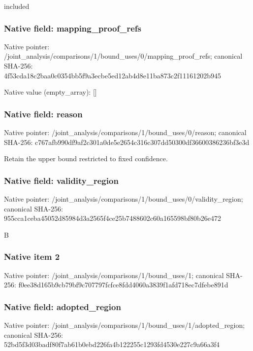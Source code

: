\documentclass[10pt,a4paper]{article}
\begin{document}
\begingroup\raggedright\sloppy included\par\endgroup

\subsubsection{Native field: mapping\_\allowbreak{}proof\_\allowbreak{}refs}
Native pointer: /joint\_\allowbreak{}analysis/comparisons/1/bound\_\allowbreak{}uses/0/mapping\_\allowbreak{}proof\_\allowbreak{}refs; canonical SHA-256: 4f53cda18c2baa0c0354bb5f9a3ecbe5ed12ab4d8e11ba873c2f11161202b945

Native value (empty\_\allowbreak{}array): []

\subsubsection{Native field: reason}
Native pointer: /joint\_\allowbreak{}analysis/comparisons/1/bound\_\allowbreak{}uses/0/reason; canonical SHA-256: c767afb990df9af2c301a0de5e2654c316c307dd50300df36600386236bf3e3d

\begingroup\raggedright\sloppy Retain the upper bound restricted to fixed confidence.\par\endgroup

\subsubsection{Native field: validity\_\allowbreak{}region}
Native pointer: /joint\_\allowbreak{}analysis/comparisons/1/bound\_\allowbreak{}uses/0/validity\_\allowbreak{}region; canonical SHA-256: 955cca1ceba45052d85984d3a2565f4ce25b7488602c60a165598bf80b26e472

\begingroup\raggedright\sloppy B\par\endgroup

\subsubsection{Native item 2}
Native pointer: /joint\_\allowbreak{}analysis/comparisons/1/bound\_\allowbreak{}uses/1; canonical SHA-256: f0ee38d165b9cb79bf9c707797fcfce8fdd4060a3839f1afd718ec7dfebe891d

\subsubsection{Native field: adopted\_\allowbreak{}region}
Native pointer: /joint\_\allowbreak{}analysis/comparisons/1/bound\_\allowbreak{}uses/1/adopted\_\allowbreak{}region; canonical SHA-256: 52bd5f3d03badf80f7ab61b0ebd226fa4b122255c1293fd4530e227c9a66a3f4
\end{document}
